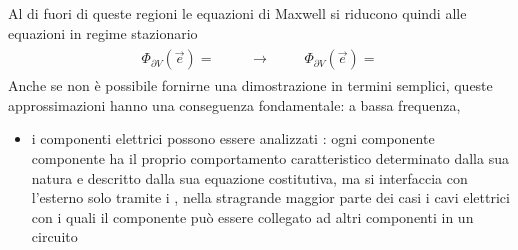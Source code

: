\documentclass[letterpaper,10pt,italian]{jupyterBook}
\begin{document}
\sphinxAtStartPar
Al di fuori di queste regioni le equazioni di Maxwell si riducono quindi alle equazioni in regime stazionario
\begin{equation*}
\begin{split}\begin{aligned}
  \Phi_{\partial V}(\vec{e}) = 
\end{aligned}
\qquad \rightarrow \qquad
\begin{aligned}
  \Phi_{\partial V}(\vec{e}) = 
\end{aligned}\end{split}
\end{equation*}
\sphinxAtStartPar
Anche se non è possibile fornirne una dimostrazione in termini semplici, queste approssimazioni hanno una conseguenza fondamentale: a bassa frequenza,
\begin{itemize}
\item {} 
\sphinxAtStartPar
i componenti elettrici possono essere analizzati : ogni componente componente ha il proprio comportamento caratteristico determinato dalla sua natura e descritto dalla sua equazione costitutiva, ma si interfaccia con l’esterno solo tramite i , nella stra\sphinxhyphen{}grande maggior parte dei casi i cavi elettrici con i quali il componente può essere collegato ad altri componenti in un circuito


\end{itemize}
\end{document}
